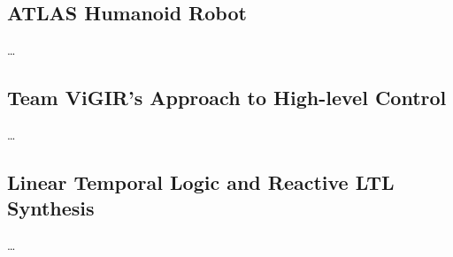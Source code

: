 
\subsection{ATLAS Humanoid Robot}

\ldots

\subsection{Team ViGIR's Approach to High-level Control}

\ldots

\subsection{Linear Temporal Logic and Reactive LTL Synthesis}

\ldots